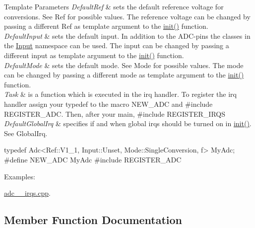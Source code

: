 \begin{DoxyTemplParams}{Template Parameters}
{\em Default\+Ref} & sets the default reference voltage for conversions. See Ref for possible values. The reference voltage can be changed by passing a different Ref as template argument to the \hyperlink{classadc_1_1Adc_a146fe898e16915e9b344019c59cdcfa3}{init()} function. \\
\hline
{\em Default\+Input} & sets the default input. In addition to the A\+D\+C-\/pins the classes in the \hyperlink{namespaceadc_1_1Input}{Input} namespace can be used. The input can be changed by passing a different input as template argument to the \hyperlink{classadc_1_1Adc_a146fe898e16915e9b344019c59cdcfa3}{init()} function. \\
\hline
{\em Default\+Mode} & sets the default mode. See Mode for possible values. The mode can be changed by passing a different mode as template argument to the \hyperlink{classadc_1_1Adc_a146fe898e16915e9b344019c59cdcfa3}{init()} function. \\
\hline
{\em Task} & is a function which is executed in the irq handler. To register the irq handler assign your typedef to the macro {\ttfamily N\+E\+W\+\_\+\+A\+DC} and {\ttfamily \#include R\+E\+G\+I\+S\+T\+E\+R\+\_\+\+A\+DC}. Then, after your main, {\ttfamily \#include R\+E\+G\+I\+S\+T\+E\+R\+\_\+\+I\+R\+QS} \\
\hline
{\em Default\+Global\+Irq} & specifies if and when global irqs should be turned on in {\ttfamily \hyperlink{classadc_1_1Adc_a146fe898e16915e9b344019c59cdcfa3}{init()}}. See Global\+Irq.\\
\hline
\end{DoxyTemplParams}
\begin{DoxyVerb}typedef Adc<Ref::V1_1, Input::Unset, Mode::SingleConversion, f> MyAdc;
#define NEW_ADC MyAdc
#include REGISTER_ADC\end{DoxyVerb}
 \begin{Desc}
\item[Examples\+: ]\par
\hyperlink{adc_2_irqs_8cpp-example}{adc\+\_\+\_\+irqs.\+cpp}.\end{Desc}


\subsection{Member Function Documentation}
\hypertarget{classadc_1_1Adc_a3d9614e14e56b6f7209040710ef6f022}{}\label{classadc_1_1Adc_a3d9614e14e56b6f7209040710ef6f022} 
